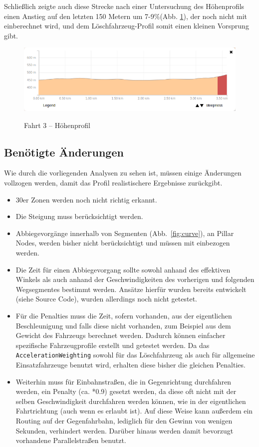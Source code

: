 Schließlich zeigte auch diese Strecke nach einer Untersuchung des Höhenprofils einen Anstieg auf den letzten 150 Metern um 7-9$\%$(Abb. \ref{fig:profile2}), der noch nicht mit einberechnet wird, und dem Löschfahrzeug-Profil somit einen kleinen Vorsprung gibt.

\begin{figure}[htb]
\centering
\caption{Fahrt 3 -- Höhenprofil}
\label{fig:profile2}
\includegraphics[width = 0.90 \textwidth]{../media/Fahrt3_Profile.png} \\
\end{figure}


\subsection{Benötigte Änderungen}

Wie durch die vorliegenden Analysen zu sehen ist, müssen einige Änderungen vollzogen werden, damit das Profil realistischere Ergebnisse zurückgibt.\par
\begin{itemize}
\item 30er Zonen werden noch nicht richtig erkannt.
\item Die Steigung muss berücksichtigt werden.
\item Abbiegevorgänge innerhalb von Segmenten (Abb.~\ref{fig:curve}), an Pillar Nodes, werden bisher nicht berücksichtigt und müssen mit einbezogen werden.
\item Die Zeit für einen Abbiegevorgang sollte sowohl anhand des effektiven Winkels als auch anhand der Geschwindigkeiten des vorherigen und folgenden Wegsegmentes bestimmt werden.
Ansätze hierfür wurden bereits entwickelt (siehe Source Code), wurden allerdings noch nicht getestet.
\item Für die Penalties muss die Zeit, sofern vorhanden, aus der eigentlichen Beschleunigung und falls diese nicht vorhanden, zum Beispiel aus dem Gewicht des Fahrzeugs berechnet werden.
Dadurch können einfacher spezifische Fahrzeugprofile erstellt und getestet werden.
Da das \texttt{AccelerationWeighting} sowohl für das Löschfahrzeug als auch für allgemeine Einsatzfahrzeuge benutzt wird, erhalten diese bisher die gleichen Penalties.
\item Weiterhin muss für Einbahnstraßen, die in Gegenrichtung durchfahren werden, ein Penalty (ca. *0.9) gesetzt werden, da diese oft nicht mit der selben Geschwindigkeit durchfahren werden können, wie in der eigentlichen Fahrtrichtung (auch wenn es erlaubt ist).
Auf diese Weise kann außerdem ein Routing auf der Gegenfahrbahn, lediglich für den Gewinn von wenigen Sekunden, verhindert werden.
Darüber hinaus werden damit bevorzugt vorhandene Parallelstraßen benutzt.
\end{itemize}
